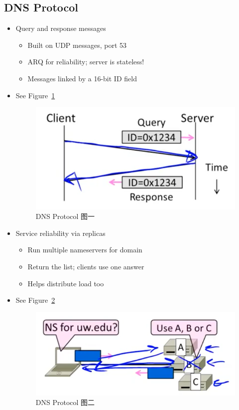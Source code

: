 \documentclass[12pt]{ctexart}   %
\begin{document}
	\subsection{DNS Protocol}
	\begin{itemize}
		\item Query and response messages
		\begin{itemize}
			\item Built on UDP messages, port 53
			\item ARQ for reliability; server is stateless!
			\item Messages linked by a 16-bit ID field
		\end{itemize}
		\item See Figure~\ref{fig:8-3-5}
		  
		 \begin{figure}[h!] %
		\centering
		 \includegraphics[scale=0.7]{images/8-3-5}
		\caption{ DNS Protocol  图一}
		 \label{fig:8-3-5}
		 \end{figure}
		 
		 \item Service reliability via replicas
		 \begin{itemize}
		 	\item Run multiple nameservers for domain
		 	\item Return the list; clients use one answer
		 	\item Helps distribute load too
		 \end{itemize}
		 \item See Figure~\ref{fig:8-3-6}
		  
		 \begin{figure}[h!] %
		\centering
		 \includegraphics[scale=0.7]{images/8-3-6}
		\caption{ DNS Protocol 图二 }
		 \label{fig:8-3-6}
		 \end{figure}
		 

\end{itemize}
\end{document}
